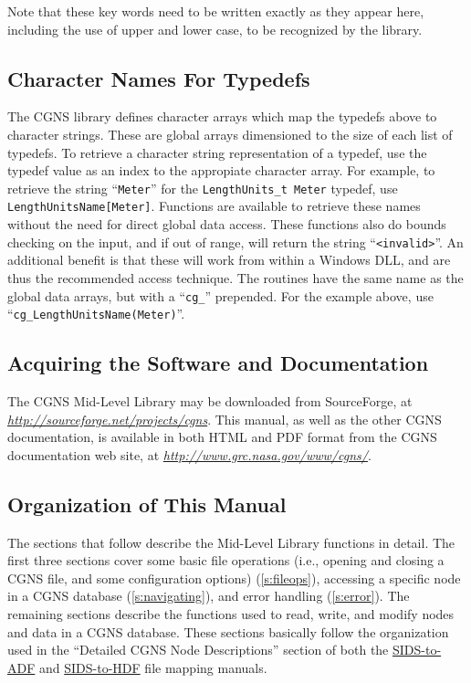 Note that these key words need to be written exactly as they
appear here, including the use of upper and lower case,
to be recognized by the library.

\subsection{Character Names For Typedefs}

The CGNS library defines character arrays which map the typedefs above
to character strings.
These are global arrays dimensioned to the size of each list of
typedefs.
To retrieve a character string representation of a typedef, use the
typedef value as an index to the appropiate character array.
For example, to retrieve the string ``\texttt{Meter}''
for the \texttt{LengthUnits\_t Meter} typedef, use
\texttt{LengthUnitsName[Meter]}.
Functions are available to retrieve these names without the need for
direct global data access.
These functions also do bounds checking on the input, and if out of
range, will return the string ``\texttt{<invalid>}''.
An additional benefit is that these will work from within a Windows DLL,
and are thus the recommended access technique.
The routines have the same name as the global data arrays, but with a
``\texttt{cg\_}'' prepended.
For the example above, use ``\texttt{cg\_LengthUnitsName(Meter)}''.

\subsection{Acquiring the Software and Documentation}

The CGNS Mid-Level Library may be downloaded from SourceForge, at
{\itshape\url{http://sourceforge.net/projects/cgns}}.
This manual, as well as the other CGNS documentation, is available in
both HTML and PDF format from the CGNS documentation web site, at
{\itshape\url{http://www.grc.nasa.gov/www/cgns/}}.

\subsection{Organization of This Manual}

The sections that follow describe the Mid-Level Library functions
in detail.
The first three sections cover some basic file operations (i.e.,
opening and closing a CGNS file, and some configuration options)
(\autoref{s:fileops}), accessing a specific node in a CGNS database
(\autoref{s:navigating}), and error handling (\autoref{s:error}).
The remaining sections describe the functions used to read, write, and
modify nodes and data in a CGNS database.
These sections basically follow the organization used in
the ``Detailed CGNS Node Descriptions'' section of both the
\href{../filemap/filemap.pdf}{SIDS-to-ADF} and
\href{../filemap_hdf/filemap.pdf}{SIDS-to-HDF} file mapping manuals.

